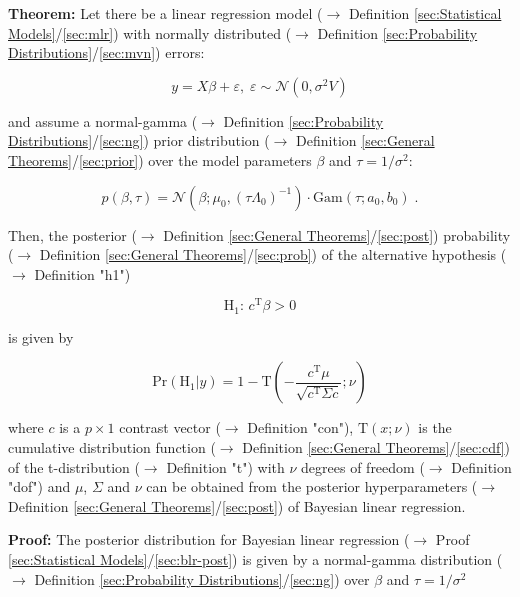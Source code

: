 \documentclass[a4paper,12pt,twoside]{book}
\begin{document}
\textbf{Theorem:} Let there be a linear regression model ($\rightarrow$ Definition \ref{sec:Statistical Models}/\ref{sec:mlr}) with normally distributed ($\rightarrow$ Definition \ref{sec:Probability Distributions}/\ref{sec:mvn}) errors:

\begin{equation} \label{eq:blr-pp-GLM}
y = X \beta + \varepsilon, \; \varepsilon \sim \mathcal{N}(0, \sigma^2 V)
\end{equation}

and assume a normal-gamma ($\rightarrow$ Definition \ref{sec:Probability Distributions}/\ref{sec:ng}) prior distribution ($\rightarrow$ Definition \ref{sec:General Theorems}/\ref{sec:prior}) over the model parameters $\beta$ and $\tau = 1/\sigma^2$:

\begin{equation} \label{eq:blr-pp-GLM-NG-prior}
p(\beta,\tau) = \mathcal{N}(\beta; \mu_0, (\tau \Lambda_0)^{-1}) \cdot \mathrm{Gam}(\tau; a_0, b_0) \; .
\end{equation}

Then, the posterior ($\rightarrow$ Definition \ref{sec:General Theorems}/\ref{sec:post}) probability ($\rightarrow$ Definition \ref{sec:General Theorems}/\ref{sec:prob}) of the alternative hypothesis ($\rightarrow$ Definition "h1")

\begin{equation} \label{eq:blr-pp-GLM-H1}
\mathrm{H}_1: \, c^\mathrm{T} \beta > 0
\end{equation}

is given by

\begin{equation} \label{eq:blr-pp-GLM-NG-PP}
\mathrm{Pr}\left( \mathrm{H}_1 | y \right) = 1 - \mathrm{T}\left( -\frac{c^\mathrm{T} \mu}{\sqrt{c^\mathrm{T} \Sigma c}}; \nu \right)
\end{equation}

where $c$ is a $p \times 1$ contrast vector ($\rightarrow$ Definition "con"), $\mathrm{T}(x; \nu)$ is the cumulative distribution function ($\rightarrow$ Definition \ref{sec:General Theorems}/\ref{sec:cdf}) of the t-distribution ($\rightarrow$ Definition "t") with $\nu$ degrees of freedom ($\rightarrow$ Definition "dof") and $\mu$, $\Sigma$ and $\nu$ can be obtained from the posterior hyperparameters ($\rightarrow$ Definition \ref{sec:General Theorems}/\ref{sec:post}) of Bayesian linear regression.


\vspace{1em}
\textbf{Proof:} The posterior distribution for Bayesian linear regression ($\rightarrow$ Proof \ref{sec:Statistical Models}/\ref{sec:blr-post}) is given by a normal-gamma distribution ($\rightarrow$ Definition \ref{sec:Probability Distributions}/\ref{sec:ng}) over $\beta$ and $\tau = 1/\sigma^2$
\end{document}
